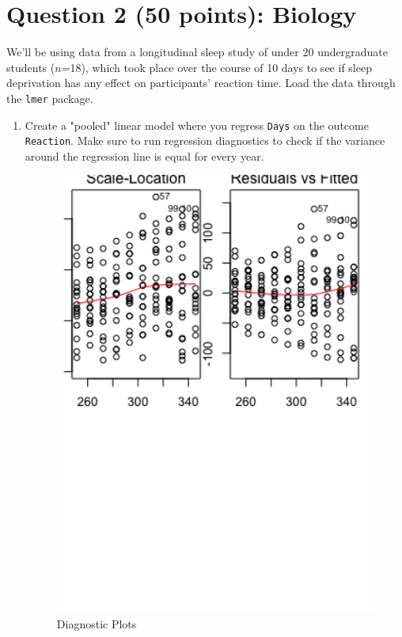 \documentclass[12pt,letterpaper]{article}
\begin{document}
\section*{Question 2 (50 points): Biology}
\noindent We'll be using data from a longitudinal sleep study of under 20 undergraduate students ($n$=18), which took place over the course of 10 days to see if sleep deprivation has any effect on participants' reaction time. Load the data through the \texttt{lmer} package.

  

\begin{enumerate}
	\item
	Create a "pooled" linear model where you regress \texttt{Days} on the outcome \texttt{Reaction}. Make sure to run regression diagnostics to check if the variance around the regression line is equal for every year.
	
	  
	
	\begin{figure}[h!]
		\caption{\footnotesize{Diagnostic Plots}}
		\vspace{.5cm}
		\centering
		\label{fig:diagnosticplots}
		\includegraphics[width=1\textwidth]{./PS7_Plot_1.png}
	\end{figure}	
	

\end{enumerate}
\end{document}

